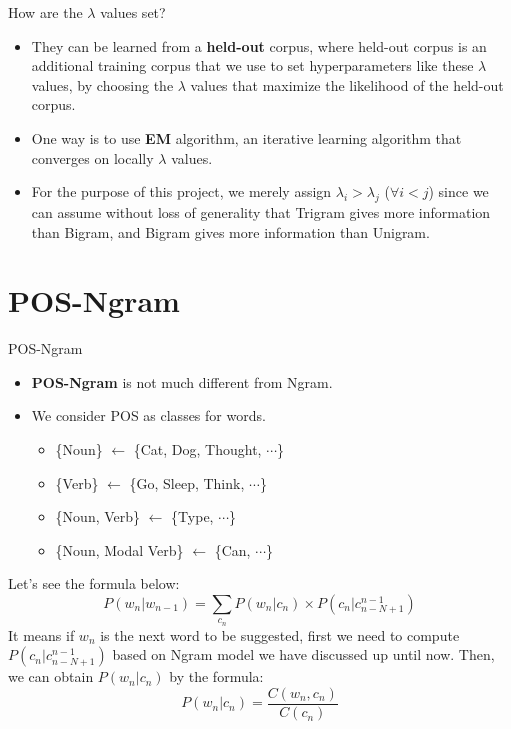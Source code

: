 \documentclass{beamer}
\begin{document}
\begin{frame}{How are the $\lambda$ values set?}
    \begin{itemize}
        \item They can be learned from a \textbf{held-out} corpus, where held-out corpus is an additional training corpus that we use to set hyperparameters like these $\lambda$ values, by choosing the $\lambda$ values that maximize the likelihood of the held-out corpus.\\
        \item One way is to use \textbf{EM} algorithm, an iterative learning algorithm that converges on locally $\lambda$ values.
        \item For the purpose of this project, we merely assign $\lambda_i > \lambda_j$ ($\forall i < j$) since we can assume without loss of generality that Trigram gives more information than Bigram, and Bigram gives more information than Unigram.
    \end{itemize}
\end{frame}

\section{POS-Ngram}
\begin{frame}{POS-Ngram}
    \begin{itemize}
        \item \textbf{POS-Ngram} is not much different from Ngram.\\
        \item We consider POS as classes for words.
            \begin{itemize}
                \item \{Noun\} $\leftarrow$ \{Cat, Dog, Thought, $\cdots$\}
                \item \{Verb\} $\leftarrow$ \{Go, Sleep, Think, $\cdots$\}
                \item \{Noun, Verb\} $\leftarrow$ \{Type, $\cdots$\}
                \item \{Noun, Modal Verb\} $\leftarrow$ \{Can, $\cdots$\}
            \end{itemize}
    \end{itemize}
    Let's see the formula below:
    $$P(w_n|w_{n-1}) = \sum_{c_n}P(w_n|c_n)\times P(c_n|c_{n-N+1}^{n-1})$$
    It means if $w_n$ is the next word to be suggested, first we need to compute $P(c_n|c_{n-N+1}^{n-1})$ based on Ngram model we have discussed up until now. Then, we can obtain $P(w_n|c_n)$ by the formula:
    $$P(w_n|c_n) = \frac{C(w_n,c_n)}{C(c_n)}$$

\end{frame}
\end{document}
